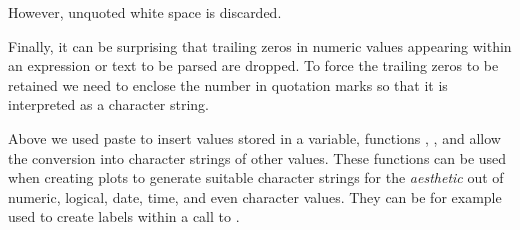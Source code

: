 \documentclass[krantz2]{krantz}\usepackage{knitr}%
\begin{document}
\begin{explainbox}
\begin{knitrout}\footnotesize
{}\color{fgcolor}\begin{kframe}
\begin{alltt}
  \hlstd{(}\hlstd{(} \hlstd{=} \hlstd{))}
\end{alltt}
\end{kframe}
\end{knitrout}

However, unquoted white space is discarded.

\begin{knitrout}\footnotesize
{}\color{fgcolor}\begin{kframe}
\begin{alltt}
  \hlstd{(}\hlstd{(} \hlstd{=} \hlstd{))}
\end{alltt}
\end{kframe}
\end{knitrout}

Finally, it can be surprising that trailing zeros in numeric values appearing within an expression or text to be parsed are dropped. To force the trailing zeros to be retained we need to enclose the number in quotation marks so that it is interpreted as a character string.

\begin{knitrout}\footnotesize
{}\color{fgcolor}\begin{kframe}
\begin{alltt}
  \hlopt{+}
  \hlstd{()} \hlopt{+}
  \hlstd{(} \hlstd{=} \hlstd{,}
            \hlstd{=} \hlstd{(}\hlstd{,} \hlstd{),}  \hlstd{=} \hlstd{(}\hlstd{,} \hlstd{,} \hlstd{),}
            \hlstd{=} \hlstd{(}\hlstd{,} \hlstd{,} \hlstd{),}  \hlstd{=} \hlstd{)}
\end{alltt}
\end{kframe}
\end{knitrout}
\end{explainbox}

Above we used paste to insert values stored in a variable, functions , , and  allow the conversion into character strings of other values. These functions can be used when creating plots to generate suitable character strings for the  \emph{aesthetic} out of numeric, logical, date, time, and even character values. They can be for example used to create labels within a call to .
\end{document}
